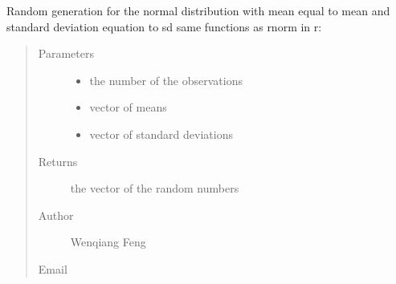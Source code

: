 \documentclass[letterpaper,12pt,english]{sphinxmanual}
\begin{document}
\begin{fulllineitems}
\label{\detokenize{api:statspy.basics.rnorm}}
Random generation for the normal distribution with mean
equal to mean and standard deviation equation to sd
same functions as rnorm in r: 
\begin{quote}\begin{description}
\item[{Parameters}] \leavevmode\begin{itemize}
\item {} 
 \textendash{} the number of the observations

\item {} 
 \textendash{} vector of means

\item {} 
 \textendash{} vector of standard deviations

\end{itemize}

\item[{Returns}] \leavevmode
the vector of the random numbers

\item[{Author}] \leavevmode
Wenqiang Feng

\item[{Email}] \leavevmode
{}

\end{description}\end{quote}

\end{fulllineitems}



\subsection{}
\label{\detokenize{api:dnorm}}
\end{document}
